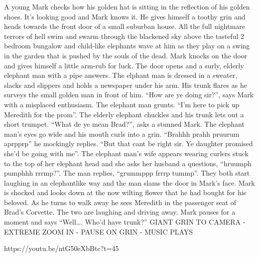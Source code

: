 A young Mark checks how his golden hat is sitting in the reflection of his golden shoes. It’s looking good and Mark knows it. He gives himself a toothy grin and heads towards the front door of a small suburban house. All the full nightmare terrors of hell swim and swarm through the blackened sky above the tasteful 2 bedroom bungalow and child-like elephants wave at him as they play on a swing in the garden that is pushed by the souls of the dead. Mark knocks on the door and gives himself a little arm-rub for luck. The door opens and a surly, elderly elephant man with a pipe answers. The elphant man is dressed in a sweater, slacks and slippers and holds a newspaper under his arm. His trunk flares as he surveys the small golden man in front of him. “How are ye doing sir?”, says Mark with a misplaced enthusiasm. The elephant man grunts. “I’m here to pick up Meredith for the prom”. The elderly elephant chuckles and his trunk lets out a short trumpet. “What de ye mean Brad?”, asks a stunned Mark. The elephant man’s eyes go wide and his mouth curls into a grin. “Brahhh prahh pruurum aprpprp” he mockingly replies. “But that cant be right sir. Ye daughter promised she’d be going with me”. The elephant man’s wife appears wearing curlers stuck to the top of her elephant head and she asks her husband a questions, “hruumph pumphhh rrrmp?”. The man replies, “grummppp frrrp tummp”. They both start laughing in an elephantlike way and the man slams the door in Mark’s face. Mark is shocked and looks down at the now wilting flower that he had bought for his beloved. As he turns to walk away he sees Meredith in the passenger seat of Brad’s Corvette. The two are laughing and driving away. Mark pauses for a moment and says “Well…. Who’d have trunk?” GIANT GRIN TO CAMERA - EXTREME ZOOM IN - PAUSE ON GRIN - MUSIC PLAYS \medskip

https://youtu.be/ntG50eXbBtc?t=45\medskip



%

\clearpage
